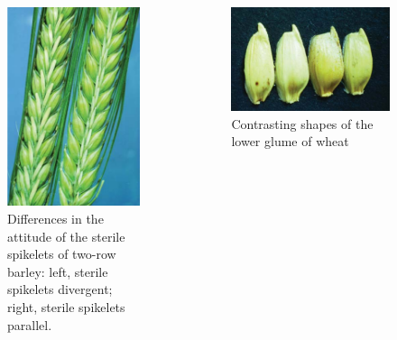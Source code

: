 \documentclass[
  ignorenonframetext,
  aspectratio=169]{beamer}
\begin{document}
\begin{frame}{}
\protect\hypertarget{section-4}{}
\begin{columns}[T,onlytextwidth]
  

\begin{figure}
\includegraphics[width=0.55\linewidth]{../images/sterile_spikelets_attitude} \caption{Differences in the attitude of the sterile spikelets of two-row barley: left, sterile spikelets divergent; right, sterile spikelets parallel.}\label{fig:spikelet-attitude}
\end{figure}


\begin{figure}
\includegraphics[width=0.75\linewidth]{../images/lower_glumes_wheat} \caption{Contrasting shapes of the lower glume of wheat}\label{fig:shape-lower-glumes}
\end{figure}

\end{columns}
\end{frame}
\end{document}
